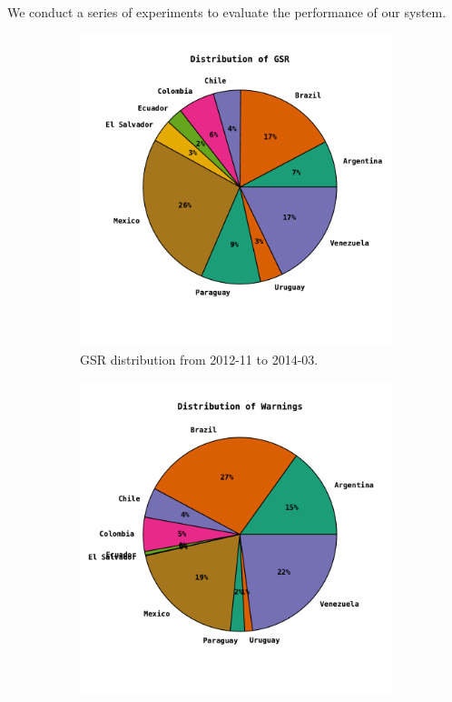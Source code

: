 \documentclass[letterpaper]{article}
\begin{document}
We conduct a series of experiments to evaluate the performance of our system.\\
\begin{figure}
\centering
\begin{subfigure}{\columnwidth}
  \centering
  \includegraphics[scale=0.4]{gsr_distribution}
  \vspace{-2em}
  \caption{GSR distribution from 2012-11 to 2014-03.}
  \label{fig:gsrdistribution}
\end{subfigure}%
\begin{subfigure}{\columnwidth}
  \centering
  \includegraphics[scale=0.4]{pp_dist}

\end{subfigure}
\end{figure}
\end{document}
